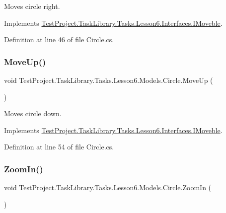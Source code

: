 Moves circle right. 



Implements \mbox{\hyperlink{interface_test_project_1_1_task_library_1_1_tasks_1_1_lesson6_1_1_interfaces_1_1_i_moveble_a1e6b39ff1e153b383e081f991501e742}{Test\+Project.\+Task\+Library.\+Tasks.\+Lesson6.\+Interfaces.\+I\+Moveble}}.



Definition at line 46 of file Circle.\+cs.

\mbox{\label{class_test_project_1_1_task_library_1_1_tasks_1_1_lesson6_1_1_models_1_1_circle_a3b0881cfdf932fb6bc56cf8c99fb110b}} 
\subsubsection{\texorpdfstring{MoveUp()}{MoveUp()}}
{\footnotesize\ttfamily void Test\+Project.\+Task\+Library.\+Tasks.\+Lesson6.\+Models.\+Circle.\+Move\+Up (\begin{DoxyParamCaption}{ }\end{DoxyParamCaption})}



Moves circle down. 



Implements \mbox{\hyperlink{interface_test_project_1_1_task_library_1_1_tasks_1_1_lesson6_1_1_interfaces_1_1_i_moveble_a2be55236c78ebdcac42f22d31abdf18e}{Test\+Project.\+Task\+Library.\+Tasks.\+Lesson6.\+Interfaces.\+I\+Moveble}}.



Definition at line 54 of file Circle.\+cs.

\mbox{\label{class_test_project_1_1_task_library_1_1_tasks_1_1_lesson6_1_1_models_1_1_circle_a9655a2ef826e2fc1e6dd7f9395d17c4b}} 
\subsubsection{\texorpdfstring{ZoomIn()}{ZoomIn()}}
{\footnotesize\ttfamily void Test\+Project.\+Task\+Library.\+Tasks.\+Lesson6.\+Models.\+Circle.\+Zoom\+In (\begin{DoxyParamCaption}{ }\end{DoxyParamCaption})}



